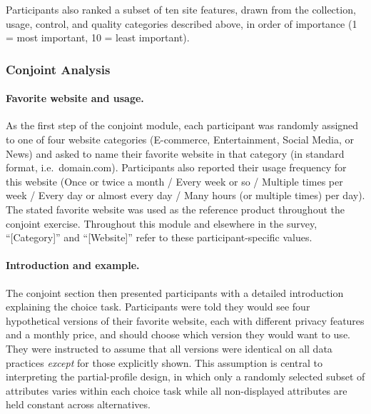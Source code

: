 \documentclass[12pt]{article}
\theoremstyle{definition}
\theoremstyle{remark}
\begin{document}
\begin{appendix}
Participants also ranked a subset of ten site features, drawn from the collection, usage, control, and quality categories described above, in order of importance (1 = most important, 10 = least important).

\subsubsection{Conjoint Analysis}\label{sec:survey_conjoint}

\paragraph{Favorite website and usage.} As the first step of the conjoint module, each participant was randomly assigned to one of four website categories (E-commerce, Entertainment, Social Media, or News) and asked to name their favorite website in that category (in standard format, i.e.\ domain.com). Participants also reported their usage frequency for this website (Once or twice a month / Every week or so / Multiple times per week / Every day or almost every day / Many hours (or multiple times) per day). The stated favorite website was used as the reference product throughout the conjoint exercise. Throughout this module and elsewhere in the survey, ``[Category]'' and ``[Website]'' refer to these participant-specific values.

\paragraph{Introduction and example.} The conjoint section then presented participants with a detailed introduction explaining the choice task. Participants were told they would see four hypothetical versions of their favorite website, each with different privacy features and a monthly price, and should choose which version they would want to use. They were instructed to assume that all versions were identical on all data practices \emph{except} for those explicitly shown. This assumption is central to interpreting the partial-profile design, in which only a randomly selected subset of attributes varies within each choice task while all non-displayed attributes are held constant across alternatives.


\end{appendix}
\end{document}

